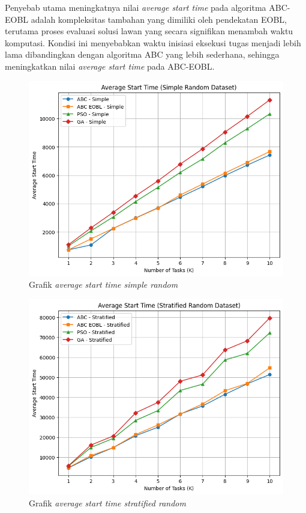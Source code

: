 Penyebab utama meningkatnya nilai \textit{average start time} pada algoritma ABC-EOBL adalah kompleksitas tambahan yang dimiliki oleh pendekatan EOBL, terutama proses evaluasi solusi lawan yang secara signifikan menambah waktu komputasi. Kondisi ini menyebabkan waktu inisiasi eksekusi tugas menjadi lebih lama dibandingkan dengan algoritma ABC yang lebih sederhana, sehingga meningkatkan nilai \textit{average start time} pada ABC-EOBL.

\newpage

\begin{figure} [H]
    \centering
    \includegraphics[width=0.75\linewidth]{gambar/Grafik Average Start Time Simple Random.png}
    \caption{Grafik \textit{average start time simple random}}
\end{figure}

\begin{figure} [H]
    \centering
    \includegraphics[width=0.75\linewidth]{gambar/Grafik Average Start Time Stratified Random.png}
    \caption{Grafik \textit{average start time stratified random}}
\end{figure}

